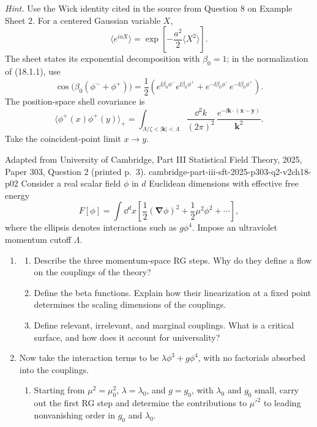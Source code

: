 \begin{enumerate}
\begin{enumerate}
    \emph{Hint.}
    Use the Wick identity cited in the source from Question 8 on Example
    Sheet 2.  For a centered Gaussian variable \(X\),
    \[
      \bigl\langle e^{iaX}\bigr\rangle
      =\exp\!\left[-\frac{a^2}{2}\langle X^2\rangle\right].
      \tag{18.1.5}
    \]
    The sheet states its exponential decomposition with \(\beta_0=1\);
    in the normalization of (18.1.1), use
    \[
      \cos\!\bigl(\beta_0(\phi^-+\phi^+)\bigr)
      =\frac12\left(
        e^{\ii\beta_0\phi^-}e^{\ii\beta_0\phi^+}
        +e^{-\ii\beta_0\phi^-}e^{-\ii\beta_0\phi^+}
      \right).
      \tag{18.1.6}
    \]
    The position-space shell covariance is
    \[
      \bigl\langle\phi^+(x)\phi^+(y)\bigr\rangle_+
      =\int_{\Lambda/\zeta<|\mathbf k|<\Lambda}
        \frac{\dd^2k}{(2\pi)^2}\,
        \frac{e^{-\ii\mathbf k\cdot(\mathbf x-\mathbf y)}}{\mathbf k^2}.
      \tag{18.1.7}
    \]
    Take the coincident-point limit \(x\to y\).
  \end{enumerate}

  {Adapted from University of Cambridge, Part III Statistical Field Theory,
  2025, Paper 303, Question 2 (printed p.~3).}
  {cambridge-part-iii-sft-2025-p303-q2-v2ch18-p02}
  Consider a real scalar field \(\phi\) in \(d\) Euclidean dimensions with
  effective free energy
  \[
    F[\phi]=\int \dd^dx\left[
      \frac12(\boldsymbol\nabla\phi)^2+\frac12\mu^2\phi^2+\cdots
    \right],
  \]
  where the ellipsis denotes interactions such as \(g\phi^4\).  Impose an
  ultraviolet momentum cutoff \(\Lambda\).
  \begin{enumerate}
    \item[(a)]
    \begin{enumerate}
      \item[(i)] Describe the three momentum-space RG steps.  Why do they
      define a flow on the couplings of the theory?
      \item[(ii)] Define the beta functions.  Explain how their
      linearization at a fixed point determines the scaling dimensions of
      the couplings.
      \item[(iii)] Define relevant, irrelevant, and marginal couplings.
      What is a critical surface, and how does it account for universality?
    \end{enumerate}
    \item[(b)]
    Now take the interaction terms to be
    \(\lambda\phi^3+g\phi^4\), with no factorials absorbed into the
    couplings.
    \begin{enumerate}
      \item[(i)] Starting from
      \(\mu^2=\mu_0^2\), \(\lambda=\lambda_0\), and \(g=g_0\), with
      \(\lambda_0\) and \(g_0\) small, carry out the first RG step and
      determine the contributions to \(\mu'^2\) to leading nonvanishing
      order in \(g_0\) and \(\lambda_0\).


\end{enumerate}
\end{enumerate}
\end{enumerate}
